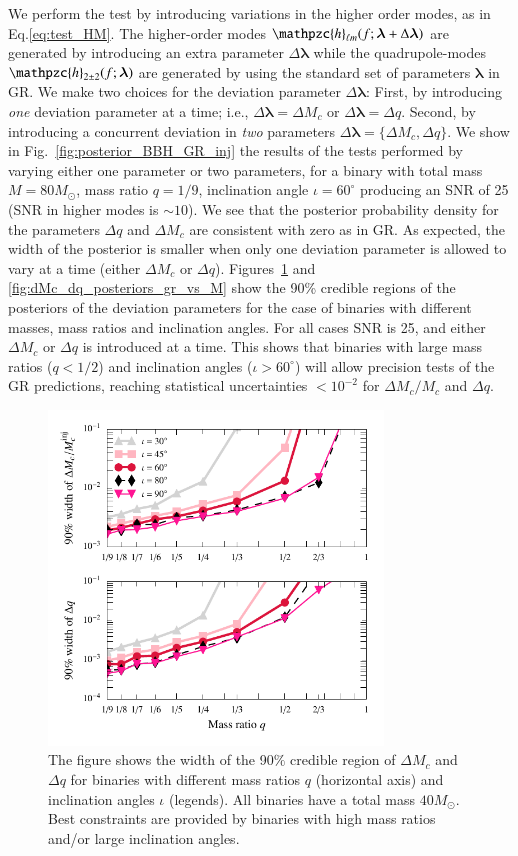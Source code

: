 \documentclass[prl,preprintnumbers,twocolumn,eqsecnum,floatfix,a4paper,nofootinbib,superscriptaddress]{revtex4}
\newcommand{\h}{\mathpzc{h}}
\newcommand{\hlm}{\mathpzc{h}_{\ell m}}
\newcommand{\blambda}{\bm{\lambda}}
\begin{document}
We perform the test by introducing variations in the higher order modes, as in Eq.\eqref{eq:test_HM}. The higher-order modes $\hlm(f; \blambda+\Delta\blambda)$ are generated by introducing an extra parameter $\Delta\blambda$ while the quadrupole-modes $\h_{2\pm2}(f; \blambda)$ are generated by using the standard set of parameters $\blambda$ in GR. We make two choices for the deviation parameter $\Delta\blambda$: First, by introducing \emph{one} deviation parameter at a time; i.e., $\Delta\blambda = {\Delta M_c}$ or $\Delta\blambda = {\Delta q}$. Second, by introducing a concurrent deviation in \emph{two} parameters $\Delta \blambda = \{\Delta M_c, \Delta q\}$. We show in Fig.~\ref{fig:posterior_BBH_GR_inj} the results of the tests performed by varying either one parameter or two parameters, for a binary with total mass $M = 80M_{\odot}$, mass ratio $q=1/9$, inclination angle $ {\iota}=60^{\circ} $ producing an SNR of 25 (SNR in higher modes is $\sim 10$). We see that the posterior probability density for the parameters $\Delta q$ and $\Delta M_c$ are consistent with zero as in GR. As expected, the width of the posterior is smaller when only one deviation parameter is allowed to vary at a time (either $\Delta M_c$ or $\Delta q$). Figures~\ref{fig:dMc_dq_posteriors_gr_vs_q} and \ref{fig:dMc_dq_posteriors_gr_vs_M} show the 90\% credible regions of the posteriors of the deviation parameters for the case of binaries with different masses, mass ratios and inclination angles. For all cases SNR is {25}, and either $\Delta M_c$ or $\Delta q$ is introduced at a time.  This shows that binaries with large mass ratios ($q < 1/ 2$) and inclination angles ($\iota > 60 ^\circ $) will allow precision tests of the GR predictions, reaching statistical uncertainties $< 10^{-2}$ for $\Delta M_c/M_c$ and $\Delta q$.  

\begin{figure}[tbh]
	\includegraphics*[width=3.5in]{figs/fig3a_9dim_dmcbymcinj_dq_abhi_q_leq_1.pdf}
	\caption{The figure shows the width of the 90$\%$ credible region of $\Delta M_c$ and $\Delta q$ for binaries with different mass ratios $q$ (horizontal axis) and inclination angles $\iota$ (legends). All binaries have a total mass $40M_{\odot}$. Best constraints are provided by binaries with high mass ratios and/or large inclination angles.}
	\label{fig:dMc_dq_posteriors_gr_vs_q}
\end{figure}
\end{document}
